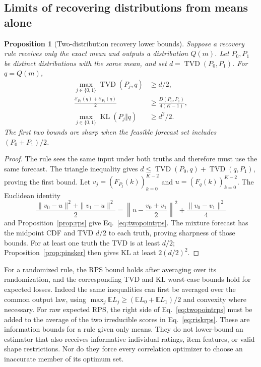 \documentclass[11pt,letterpaper]{article}
\newtheorem{proposition}{Proposition}
\newcommand{\KL}{\operatorname{KL}}
\newcommand{\TV}{\operatorname{TVD}}
\newcommand{\E}{\mathbb{E}}
\begin{document}
\subsection{Limits of recovering distributions from means alone}
\begin{proposition}[Two-distribution recovery lower bounds]\label{prop:lower}
Suppose a recovery rule receives only the exact mean and outputs a distribution $Q(m)$.
Let $P_0,P_1$ be distinct distributions with the same mean, and set $d=\TV(P_0,P_1)$.
For $q=Q(m)$,
\begin{align}
 \max_{j\in\{0,1\}}\TV(P_j,q)&\ge d/2,\\
 \frac{\mathcal E_{P_0}(q)+\mathcal E_{P_1}(q)}2
 &\ge\frac{D(P_0,P_1)}{4(K-1)},\label{eq:twopointrps}\\
 \max_{j\in\{0,1\}}\KL(P_j\Vert q)&\ge d^2/2.
\end{align}
The first two bounds are sharp when the feasible forecast set includes $(P_0+P_1)/2$.
\end{proposition}
\begin{proof}
The rule sees the same input under both truths and therefore must use the same forecast.
The triangle inequality gives $d\le\TV(P_0,q)+\TV(q,P_1)$, proving the first bound.
Let $v_j=(F_{P_j}(k))_{k=0}^{K-2}$ and $u=(F_q(k))_{k=0}^{K-2}$.
The Euclidean identity
\[
 \frac{\|v_0-u\|^2+\|v_1-u\|^2}{2}
 =\left\|u-\frac{v_0+v_1}{2}\right\|^2+\frac{\|v_0-v_1\|^2}{4}
\]
and Proposition~\ref{prop:rps} give Eq.~\eqref{eq:twopointrps}.
The mixture forecast has the midpoint CDF and TVD $d/2$ to each truth, proving sharpness of those bounds.
For at least one truth the TVD is at least $d/2$; Proposition~\ref{prop:pinsker} then gives KL at least $2(d/2)^2$.
\end{proof}

For a randomized rule, the RPS bound holds after averaging over its randomization, and the corresponding TVD and KL worst-case bounds hold for expected losses.
Indeed the same inequalities can first be averaged over the common output law, using $\max_j\E L_j\ge(\E L_0+\E L_1)/2$ and convexity where necessary.
For raw expected RPS, the right side of Eq.~\eqref{eq:twopointrps} must be added to the average of the two irreducible scores in Eq.~\eqref{eq:riskrps}.
These are information bounds for a rule given only means.
They do not lower-bound an estimator that also receives informative individual ratings, item features, or valid shape restrictions.
Nor do they force every correlation optimizer to choose an inaccurate member of its optimum set.
\end{document}
